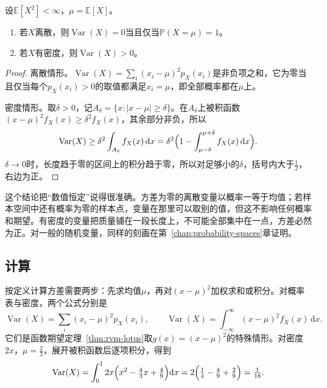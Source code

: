 \begin{theorem}[方差为零的变量]
\label{thm:rvm-zero-variance}
设$\mathbb{E}[X^{2}]<\infty$，$\mu=\mathbb{E}[X]$。
\begin{enumerate}
 \item 若$X$离散，则$\operatorname{Var}(X)=0$当且仅当$\mathbb{P}(X=\mu)=1$。
 \item 若$X$有密度，则$\operatorname{Var}(X)>0$。
\end{enumerate}
\end{theorem}

\begin{proof}
离散情形。$\operatorname{Var}(X)=\sum_i(x_i-\mu)^{2}p_X(x_i)$是非负项之和，它为零当且仅当每个$p_X(x_i)>0$的取值都满足$x_i=\mu$，即全部概率都在$\mu$上。

密度情形。取$\delta>0$，记$A_{\delta}=\{x:\lvert x-\mu\rvert\geq\delta\}$。在$A_{\delta}$上被积函数$(x-\mu)^{2}f_X(x)\geq\delta^{2}f_X(x)$，其余部分非负，所以
\[
 \operatorname{Var}(X)\geq\delta^{2}\int_{A_{\delta}}f_X(x)\,\mathrm{d}x=\delta^{2}\Bigl(1-\int_{\mu-\delta}^{\mu+\delta}f_X(x)\,\mathrm{d}x\Bigr) .
\]
$\delta\to0$时，长度趋于零的区间上的积分趋于零，所以对足够小的$\delta$，括号内大于$\tfrac12$，右边为正。
\end{proof}

这个结论把“数值恒定”说得很准确。方差为零的离散变量以概率一等于均值；若样本空间中还有概率为零的样本点，变量在那里可以取别的值，但这不影响任何概率和期望。有密度的变量把质量铺在一段长度上，不可能全部集中在一点，方差必然为正。对一般的随机变量，同样的刻画在第~\ref{chap:probability-spaces}章证明。

\subsection{计算}
\label{sec:rvm-variance-computation}

按定义计算方差需要两步：先求均值$\mu$，再对$(x-\mu)^{2}$加权求和或积分。对概率表与密度，两个公式分别是
\begin{equation}
 \operatorname{Var}(X)=\sum_{i}(x_i-\mu)^{2}p_X(x_i),\qquad
 \operatorname{Var}(X)=\int_{-\infty}^{\infty}(x-\mu)^{2}f_X(x)\,\mathrm{d}x .
 \label{eq:rvm-variance-formulas}
\end{equation}
它们是函数期望定理~\ref{thm:rvm-lotus}取$g(x)=(x-\mu)^{2}$的特殊情形。对密度$2x$，$\mu=\tfrac23$，展开被积函数后逐项积分，得到
\[
 \operatorname{Var}(X)=\int_0^12x\Bigl(x^{2}-\tfrac43x+\tfrac49\Bigr)\mathrm{d}x
 =2\Bigl(\tfrac14-\tfrac49+\tfrac29\Bigr)=\tfrac{1}{18} .
\]

